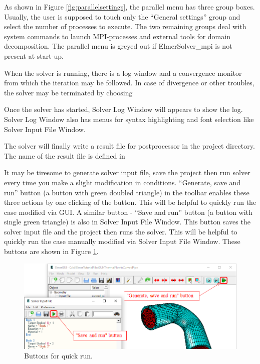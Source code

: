 As shown in Figure \ref{fig:parallelsettings}, the parallel menu has three group boxes. Usually, the user is supposed to touch
only the ``General settings'' group and select the number of processes to execute.
The two remaining groups deal with system commands to launch MPI-processes and
external tools for domain decomposition.  The parallel menu is greyed out if
ElmerSolver\_mpi is not present at start-up.

When the solver is running, there is a log window and a convergence monitor
from which the iteration may be followed. In case of divergence or other troubles,
the solver may be terminated by choosing

Once the solver has started, Solver Log Window will appears to show the log. Solver Log Window also has menus for syntax highlighting and font selection like Solver Input File Window. 

The solver will finally write a result file for postprocessor in the project directory.
The name of the result file is defined in

It may be tiresome to generate solver input file, save the project then run solver every time you make a slight modification in conditions. ``Generate, save and run'' button (a button with green doubled triangle) in the toolbar enables these three actions by one clicking of the button. This will be helpful to quickly run the case modified via GUI.
A similar button - ``Save and run'' button (a button with single green triangle) is also in Solver Input File Window. This button saves the solver input file and the project then runs the solver. This will be helpful to quickly run the case manually modified via Solver Input File Window. 
These buttons are shown in Figure \ref{fig:quickbuttons}.

\begin{figure}[htb]
	\begin{center}
		\includegraphics[scale=0.5]{images/quickrunbuttons.png}
		\caption{Buttons for quick run.}
		\label{fig:quickbuttons}
	\end{center}
\end{figure}
